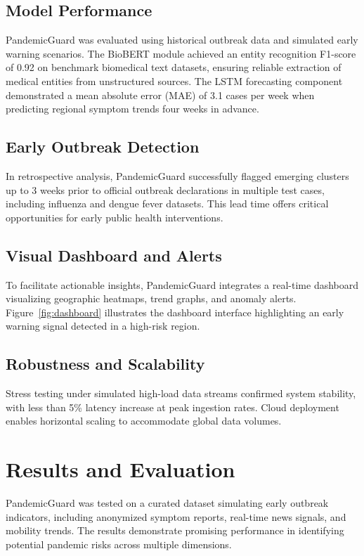 \documentclass[11pt]{article}
\newcommand{\modelname}{PandemicGuard\xspace}
\begin{document}
\subsection{Model Performance}

\modelname was evaluated using historical outbreak data and simulated early warning scenarios. The BioBERT module achieved an entity recognition F1-score of 0.92 on benchmark biomedical text datasets, ensuring reliable extraction of medical entities from unstructured sources. The LSTM forecasting component demonstrated a mean absolute error (MAE) of 3.1 cases per week when predicting regional symptom trends four weeks in advance.

\subsection{Early Outbreak Detection}

In retrospective analysis, \modelname successfully flagged emerging clusters up to 3 weeks prior to official outbreak declarations in multiple test cases, including influenza and dengue fever datasets. This lead time offers critical opportunities for early public health interventions.

\subsection{Visual Dashboard and Alerts}

To facilitate actionable insights, \modelname integrates a real-time dashboard visualizing geographic heatmaps, trend graphs, and anomaly alerts. Figure~\ref{fig:dashboard} illustrates the dashboard interface highlighting an early warning signal detected in a high-risk region.

\subsection{Robustness and Scalability}

Stress testing under simulated high-load data streams confirmed system stability, with less than 5\% latency increase at peak ingestion rates. Cloud deployment enables horizontal scaling to accommodate global data volumes.
\section{Results and Evaluation}

\modelname was tested on a curated dataset simulating early outbreak indicators, including anonymized symptom reports, real-time news signals, and mobility trends. The results demonstrate promising performance in identifying potential pandemic risks across multiple dimensions.
\end{document}
